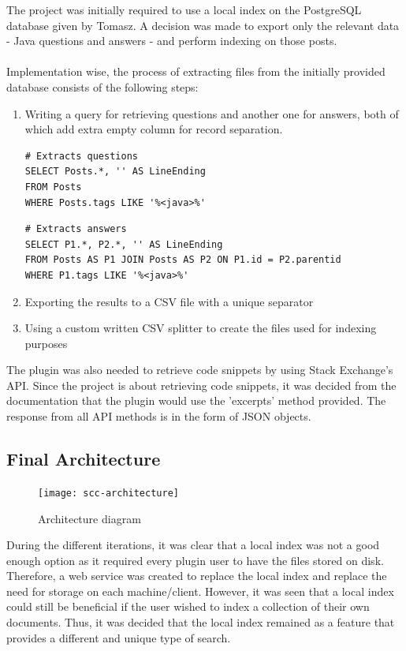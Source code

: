 \documentclass{l4proj}
\begin{document}
The project was initially required to use a local index on the PostgreSQL database given by Tomasz. A decision was made to export only the relevant data - Java questions and answers - and perform indexing on those posts. 
\\
\\
Implementation wise, the process of extracting files from the initially provided database consists of the following steps:
\begin{enumerate}
  \item Writing a query for retrieving questions and another one for answers, both of which add extra empty column for record separation.

\begin{lstlisting}
# Extracts questions
SELECT Posts.*, '' AS LineEnding
FROM Posts
WHERE Posts.tags LIKE '%<java>%'
\end{lstlisting}

\begin{lstlisting}
# Extracts answers
SELECT P1.*, P2.*, '' AS LineEnding
FROM Posts AS P1 JOIN Posts AS P2 ON P1.id = P2.parentid
WHERE P1.tags LIKE '%<java>%'
\end{lstlisting}

\item Exporting the results to a CSV file with a unique separator
\item Using a custom written CSV splitter to create the files used for indexing purposes
\end{enumerate}

\noindent
The plugin was also needed to retrieve code snippets by using Stack Exchange's API. Since the project is about retrieving code snippets, it was decided from the documentation that the plugin would use the 'excerpts' method provided. The response from all API methods is in the form of JSON objects.

\subsection{Final Architecture}

\begin{figure}[H]
\texttt{[image: scc-architecture]}
\centering
\caption{Architecture diagram}
\label{fig:architecture}
\end{figure}

During the different iterations, it was clear that a local index was not a good enough option as it required every plugin user to have the files stored on disk. Therefore, a web service was created to replace the local index and replace the need for storage on each machine/client. However, it was seen that a local index could still be beneficial if the user wished to index a collection of their own documents. Thus, it was decided that the local index remained as a feature that provides a different and unique type of search.
\end{document}
